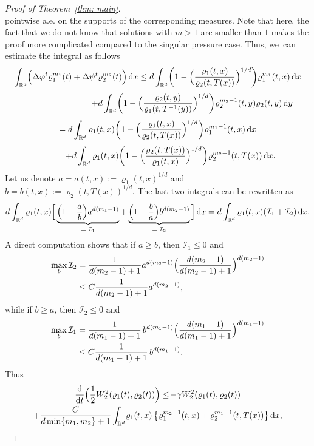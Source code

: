 \documentclass[10pt]{amsart}
\newcommand{\Bprt}[1]{\Bigl(#1\Bigr)}
\newcommand{\bbprt}[1]{\biggl(#1\biggr)}
\newcommand{\curlyI}{\mathcal{I}}
\newcommand{\dx}[1]{\mathop{}\!\mathrm{d} #1}
\newcommand{\ddt}{\frac{\dx{}}{\dx{t}}}
\newcommand{\R}{\mathbb{R}}
\theoremstyle{plain}
\theoremstyle{remark}
\begin{document}
\begin{proof}[Proof of Theorem~\ref{thm: main}]
\[\]
pointwise a.e. on the supports of the corresponding measures. Note that here, the fact that we do not know that solutions with $m>1$ are smaller than $1$ makes the proof more complicated compared to the singular pressure case.
Thus, we~can estimate the integral as follows
\begin{multline*}
\int_{\R^d} \Bprt{\Delta \varphi^t \varrho_1^{m_1}(t) +\Delta \psi^t \varrho_2^{m_2}(t) }\dx x
\leq d \int_{\R^d} \bbprt{1-\Bprt{\frac{\varrho_1(t,x)}{\varrho_2(t,T(x))}}^{1/d}} \varrho_1^{m_1}(t,x)\dx x \\[3pt]
\shoveright{+ d \int_{\R^d} \bbprt{1-\Bprt{\frac{\varrho_2(t,y)}{\varrho_1(t,T^{-1}(y))}}^{1/d}} \varrho_2^{m_2-1}(t,y) \varrho_2(t,y)\dx y}\\[3pt]
= d \int_{\R^d} \varrho_1(t,x) \bbprt{1-\Bprt{\frac{\varrho_1(t,x)}{\varrho_2(t,T(x))}}^{1/d}} \varrho_1^{m_1-1}(t,x) \dx x \\[3pt]
\qquad\quad + d\int_{\R^d}\varrho_1(t,x)\bbprt{1-\Bprt{\frac{\varrho_2(t,T(x))}{\varrho_1(t,x)}}^{1/d}} \varrho_2^{m_2-1}(t,T(x))\dx x.
\end{multline*}
Let us denote $a=a(t,x):= \varrho_1(t,x)^{1/d}$ and $b=b(t,x):=\varrho_2(t,T(x))^{1/d}$. The last two integrals can be rewritten as
\[
d \int_{\R^d} \varrho_1(t,x) \Big[\underbrace{\Bprt{1-\frac ab } a^{d(m_1-1)}}_{=:\curlyI_1} + \underbrace{\Bprt{1-\frac ba} b^{d(m_2-1)}}_{=:\curlyI_2}\Big]\dx x
= d \int_{\R^d} \varrho_1(t,x) (\curlyI_1 + \curlyI_2) \dx x.
\]
A direct computation shows that if $a\ge b$, then $\curlyI_1\le 0$ and
\begin{align*}
\max_b \curlyI_2 &= \frac{1}{d(m_2-1)+1} a^{d(m_2-1)} \Bigl(\frac{d(m_2-1)}{d(m_2-1)+1}\Bigr)^{d(m_2-1)} \\
&\leq C \frac{1}{d(m_2-1)+1}a^{d(m_2-1)},
\end{align*}
while if $b\ge a$, then $\curlyI_2\le 0$ and
\begin{align*}
\max_b \curlyI_1 &= \frac{1}{d(m_1-1)+1}\, b^{d(m_1-1)} \Bigl(\frac{d(m_1-1)}{d(m_1-1)+1}\Bigr)^{d(m_1-1)} \\
&\leq C \frac{1}{d(m_1-1)+1}\,b^{d(m_1-1)}.
\end{align*}
Thus
\begin{multline*}\label{intermediate}
\ddt\Bprt{\frac 12 W_2^2(\varrho_1(t), \varrho_2(t))}\leq \!- \gamma W_2^2(\varrho_1(t), \varrho_2(t))\\
+ \frac{C}{d\min\{m_1,m_2\}+1} \int_{\R^d}\! \varrho_1(t,x)\left\{\varrho_1^{m_2-1}(t,x)+\varrho_2^{m_1-1}(t,T(x))\right\}\dx x,
\end{multline*}

\end{proof}
\end{document}
